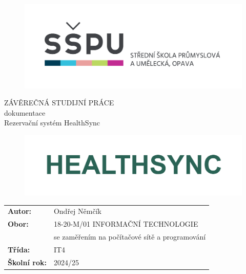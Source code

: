\documentclass[12pt, a4paper,
openright
]{report}
\title{\nazevPrace} %
\author{\jmenoAutora} %
\date{\datumOdevzdani} %
\newcommand\obor{INFORMAČNÍ TECHNOLOGIE} %
\newcommand\kodOboru{18-20-M/01} %
\newcommand\zamereni{se zaměřením na počítačové sítě a programování} %
\newcommand\trida{IT4} %
\newcommand\jmenoAutora{Ondřej Němčík}  %
\newcommand\skolniRok{2024/25} %
\newcommand\nazevPrace{Rezervační systém HealthSync} %
\begin{document}
	
	\pagestyle{empty}
	\setcounter{page}{1}
	
	\cleardoublepage

	
	{\selectfont
		\begin{figure}[h]
			\centering
			\includegraphics[width=0.6\linewidth]{image/logo-skoly.png} 
		\end{figure}
		
		
		{\bfseries %
			\begin{center}
				\vspace{0.025 \textheight}
				\LARGE{ZÁVĚREČNÁ STUDIJNÍ PRÁCE}\\
				\large{dokumentace}\\
				\vspace{0.075 \textheight}
				\LARGE {\nazevPrace}\\
			\end{center}  
		}%
		
		\begin{figure}[h]
			\centering
			\includegraphics[width=0.8\linewidth]{image/image.png} 
		\end{figure}
		
		\vspace{0.02 \textheight}
		\begin{table}[h!]
			\begin{tabular}{ll}
				\textbf{Autor:} & \jmenoAutora\\ 
				\textbf{Obor:} & \kodOboru { } \obor\\
				\textbf{} & \zamereni\\
				\textbf{Třída:} & \trida\\
				\textbf{Školní rok:} & \skolniRok\\
			\end{tabular}
			
		\end{table}		
	}
	
\end{document}

